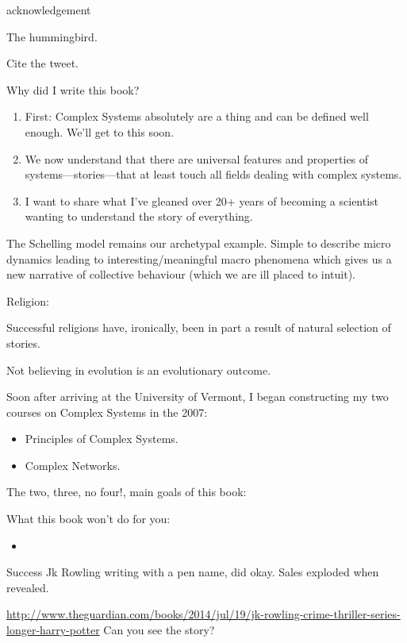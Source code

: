 acknowledgement

The hummingbird.

Cite the tweet.




Why did I write this book?

\begin{enumerate}
\item 
  First: Complex Systems absolutely are a thing and can be defined well
  enough.  We'll get to this soon.
\item 
  We now understand that there are universal features and properties
  of systems---stories---that at least touch all fields dealing
  with complex systems.
\item 
  I want to share what I've gleaned over 20+ years of
  becoming a scientist wanting to understand the story of everything.
\end{enumerate}



The Schelling model remains our archetypal example.  Simple to
describe micro dynamics leading to interesting/meaningful macro
phenomena which gives us a new narrative of collective behaviour
(which we are ill placed to intuit).

Religion:

Successful religions have, ironically, been in part 
a result of natural selection of stories.


Not believing in evolution is an evolutionary outcome.


Soon after arriving at the University of Vermont,
I began constructing my two courses on Complex Systems
in the 2007:
\begin{itemize}
\item 
  Principles of Complex Systems.
\item 
  Complex Networks.
\end{itemize}

The two, three, no four!, main goals of this book:

What this book won't do for you:

\begin{itemize}
\item 
  
\end{itemize}


Success
Jk Rowling writing with a pen name, did okay.
Sales exploded when revealed.

\url{http://www.theguardian.com/books/2014/jul/19/jk-rowling-crime-thriller-series-longer-harry-potter}
Can you see the story?

